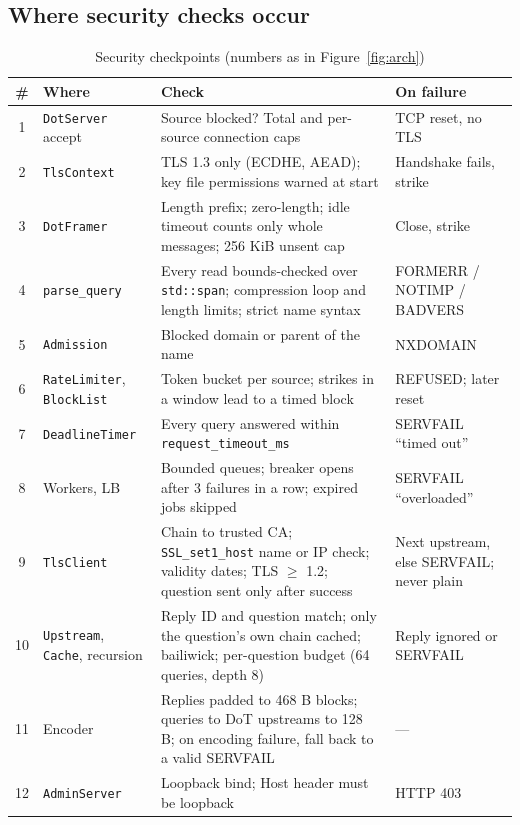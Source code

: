 \documentclass[11pt,a4paper]{article}
\newcommand{\code}[1]{\texttt{#1}}
\begin{document}
\subsection{Where security checks occur}
\begin{table}[H]
\centering\small
\caption{Security checkpoints (numbers as in Figure~\ref{fig:arch})}\label{tab:checks}
\begin{tabularx}{\textwidth}{@{}cP{3.1cm}LP{2.5cm}@{}}
\toprule
\# & Where & Check & On failure \\
 & \code{DotServer} accept & Source blocked? Total and per-source connection caps & TCP reset, no TLS \\
2 & \code{TlsContext} & TLS 1.3 only (ECDHE, AEAD); key file permissions warned at start & Handshake fails, strike \\
3 & \code{DotFramer} & Length prefix; zero-length; idle timeout counts only whole messages; 256 KiB unsent cap & Close, strike \\
4 & \code{parse\_query} & Every read bounds-checked over \code{std::span}; compression loop and length limits; strict name syntax & FORMERR / NOTIMP / BADVERS \\
5 & \code{Admission} & Blocked domain or parent of the name & NXDOMAIN \\
6 & \code{RateLimiter}, \code{BlockList} & Token bucket per source; strikes in a window lead to a timed block & REFUSED; later reset \\
7 & \code{DeadlineTimer} & Every query answered within \code{request\_timeout\_ms} & SERVFAIL ``timed out'' \\
8 & Workers, LB & Bounded queues; breaker opens after 3 failures in a row; expired jobs skipped & SERVFAIL ``overloaded'' \\
9 & \code{TlsClient} & Chain to trusted CA; \code{SSL\_set1\_host} name or IP check; validity dates; TLS $\ge$ 1.2; question sent only after success & Next upstream, else SERVFAIL; never plain \\
10 & \code{Upstream}, \code{Cache}, recursion & Reply ID and question match; only the question's own chain cached; bailiwick; per-question budget (64 queries, depth 8) & Reply ignored or SERVFAIL \\
11 & Encoder & Replies padded to 468 B blocks; queries to DoT upstreams to 128 B; on encoding failure, fall back to a valid SERVFAIL & --- \\
12 & \code{AdminServer} & Loopback bind; Host header must be loopback & HTTP 403 \\
\bottomrule
\end{tabularx}
\end{table}
\end{document}
